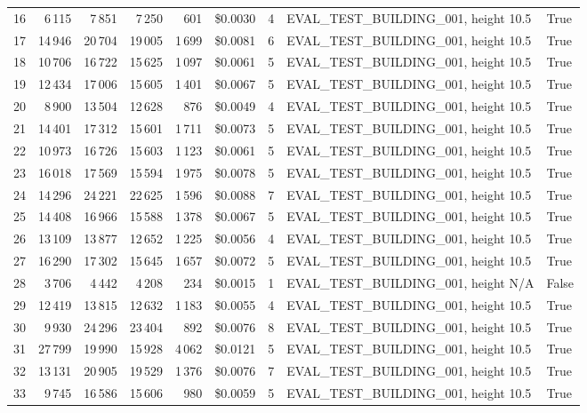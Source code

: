 \documentclass[a4paper,11pt]{article}
\begin{document}
\begin{table}[ht]
\begin{tabular}{r r r r r r r p{3cm} l}
16 & 6\,115 & 7\,851 & 7\,250 & 601 & \$0.0030 & 4 & EVAL\_TEST\_BUILDING\_001, height 10.5 & True \\
17 & 14\,946 & 20\,704 & 19\,005 & 1\,699 & \$0.0081 & 6 & EVAL\_TEST\_BUILDING\_001, height 10.5 & True \\
18 & 10\,706 & 16\,722 & 15\,625 & 1\,097 & \$0.0061 & 5 & EVAL\_TEST\_BUILDING\_001, height 10.5 & True \\
19 & 12\,434 & 17\,006 & 15\,605 & 1\,401 & \$0.0067 & 5 & EVAL\_TEST\_BUILDING\_001, height 10.5 & True \\
20 & 8\,900 & 13\,504 & 12\,628 & 876 & \$0.0049 & 4 & EVAL\_TEST\_BUILDING\_001, height 10.5 & True \\
21 & 14\,401 & 17\,312 & 15\,601 & 1\,711 & \$0.0073 & 5 & EVAL\_TEST\_BUILDING\_001, height 10.5 & True \\
22 & 10\,973 & 16\,726 & 15\,603 & 1\,123 & \$0.0061 & 5 & EVAL\_TEST\_BUILDING\_001, height 10.5 & True \\
23 & 16\,018 & 17\,569 & 15\,594 & 1\,975 & \$0.0078 & 5 & EVAL\_TEST\_BUILDING\_001, height 10.5 & True \\
24 & 14\,296 & 24\,221 & 22\,625 & 1\,596 & \$0.0088 & 7 & EVAL\_TEST\_BUILDING\_001, height 10.5 & True \\
25 & 14\,408 & 16\,966 & 15\,588 & 1\,378 & \$0.0067 & 5 & EVAL\_TEST\_BUILDING\_001, height 10.5 & True \\
26 & 13\,109 & 13\,877 & 12\,652 & 1\,225 & \$0.0056 & 4 & EVAL\_TEST\_BUILDING\_001, height 10.5 & True \\
27 & 16\,290 & 17\,302 & 15\,645 & 1\,657 & \$0.0072 & 5 & EVAL\_TEST\_BUILDING\_001, height 10.5 & True \\
28 & 3\,706 & 4\,442 & 4\,208 & 234 & \$0.0015 & 1 & EVAL\_TEST\_BUILDING\_001, height N/A & False \\
29 & 12\,419 & 13\,815 & 12\,632 & 1\,183 & \$0.0055 & 4 & EVAL\_TEST\_BUILDING\_001, height 10.5 & True \\
30 & 9\,930 & 24\,296 & 23\,404 & 892 & \$0.0076 & 8 & EVAL\_TEST\_BUILDING\_001, height 10.5 & True \\
31 & 27\,799 & 19\,990 & 15\,928 & 4\,062 & \$0.0121 & 5 & EVAL\_TEST\_BUILDING\_001, height 10.5 & True \\
32 & 13\,131 & 20\,905 & 19\,529 & 1\,376 & \$0.0076 & 7 & EVAL\_TEST\_BUILDING\_001, height 10.5 & True \\
33 & 9\,745 & 16\,586 & 15\,606 & 980 & \$0.0059 & 5 & EVAL\_TEST\_BUILDING\_001, height 10.5 & True \\

\end{tabular}
\end{table}
\end{document}
